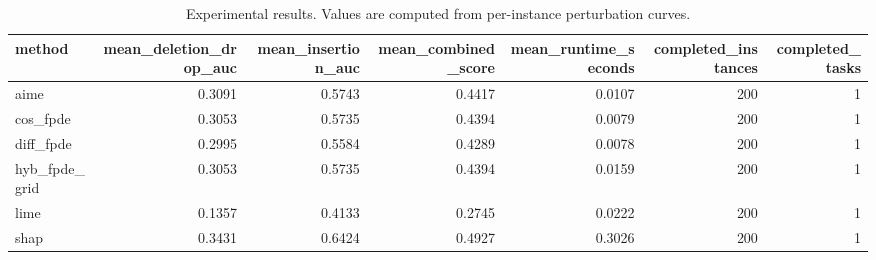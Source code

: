 \begin{table}[t]
\caption{Experimental results. Values are computed from per-instance perturbation curves.}
\label{tab:main_results_computed}
\centering
\begin{tabular}{lrrrrrr}
\toprule
method & mean\_deletion\_drop\_auc & mean\_insertion\_auc & mean\_combined\_score & mean\_runtime\_seconds & completed\_instances & completed\_tasks \\
\midrule
aime & 0.3091 & 0.5743 & 0.4417 & 0.0107 & 200 & 1 \\
cos\_fpde & 0.3053 & 0.5735 & 0.4394 & 0.0079 & 200 & 1 \\
diff\_fpde & 0.2995 & 0.5584 & 0.4289 & 0.0078 & 200 & 1 \\
hyb\_fpde\_grid & 0.3053 & 0.5735 & 0.4394 & 0.0159 & 200 & 1 \\
lime & 0.1357 & 0.4133 & 0.2745 & 0.0222 & 200 & 1 \\
shap & 0.3431 & 0.6424 & 0.4927 & 0.3026 & 200 & 1 \\
\bottomrule
\end{tabular}

\end{table}
